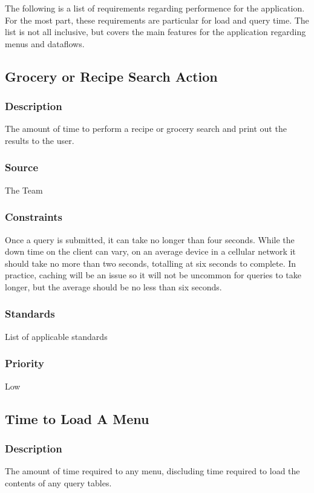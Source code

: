 The following is a list of requirements regarding performence for the application.  For the most part, these requirements are particular for load and query time.  The list is not all inclusive, but covers the main features for the application regarding menus and dataflows.
\subsection{Grocery or Recipe Search Action}
\subsubsection{Description}
The amount of time to perform a recipe or grocery search and print out the results to the user.
\subsubsection{Source}
The Team
\subsubsection{Constraints}
Once a query is submitted, it can take no longer than four seconds.  
While the down time on the client can vary, on an average device in a cellular network it should take no more than two seconds, totalling at six seconds to complete.
In practice, caching will be an issue so it will not be uncommon for queries to take longer, but the average should be no less than six seconds.
\subsubsection{Standards}
List of applicable standards
\subsubsection{Priority}
Low

\subsection{Time to Load A Menu}
\subsubsection{Description}
The amount of time required to any menu, discluding time required to load the contents of any query tables.
